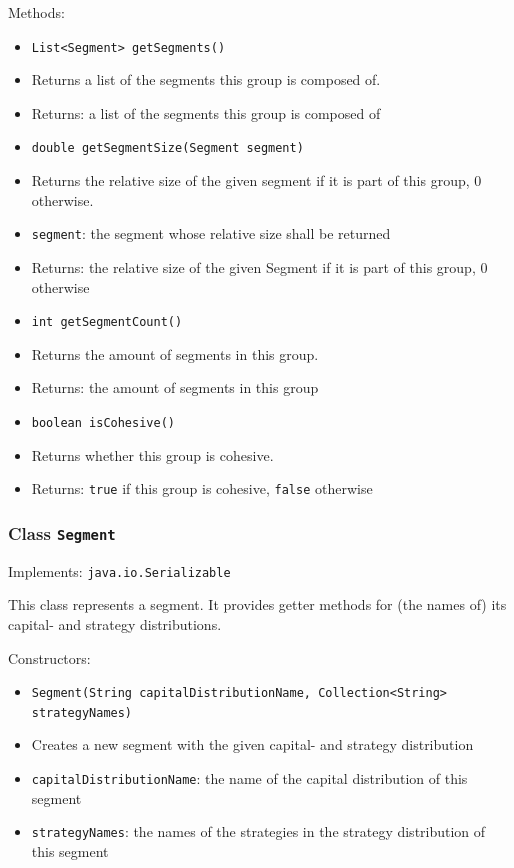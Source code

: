 \documentclass[parskip=full,11pt]{scrartcl}
\begin{document}
Methods:
\begin{itemize}\itemsep -10pt
\item \texttt{List<Segment> getSegments()}
\item[] Returns a list of the segments this group is composed of.
\item[] Returns: a list of the segments this group is composed of

\item \texttt{double getSegmentSize(Segment segment)}
\item[] Returns the relative size of the given segment if it is part of this group, \(0\) otherwise.
\item[] \texttt{segment}: the segment whose relative size shall be returned
\item[] Returns: the relative size of the given Segment if it is part of this group, \(0\) otherwise

\item \texttt{int getSegmentCount()}
\item[] Returns the amount of segments in this group.
\item[] Returns: the amount of segments in this group

\item \texttt{boolean isCohesive()}
\item[] Returns whether this group is cohesive.
\item[] Returns: \texttt{true} if this group is cohesive, \texttt{false} otherwise
\end{itemize}

\subsubsection{Class \texttt{Segment}}
Implements: \texttt{java.io.Serializable}

This class represents a segment. It provides getter methods for (the names of) its capital- and strategy distributions.

Constructors:
\begin{itemize}\itemsep -10pt
\item \texttt{Segment(String capitalDistributionName, Collection<String> strategyNames)}
\item[] Creates a new segment with the given capital- and strategy distribution
\item[] \texttt{capitalDistributionName}: the name of the capital distribution of this segment
\item[] \texttt{strategyNames}: the names of the strategies in the strategy distribution of this segment
\end{itemize}
\end{document}
